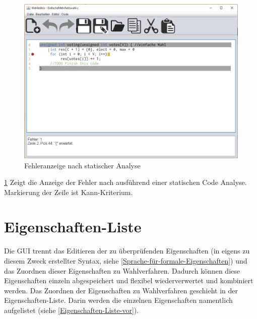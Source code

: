 \documentclass[a4paper]{scrreprt}
\begin{document}
\begin{figure}[H]
\includegraphics[scale=0.4]{Editor-mit-Fehler-nach-statischer-analyse.png}
\caption{Fehleranzeige nach statischer Analyse}
\label{Editor-mit-Fehler-nach-statischer-analyse}
\end{figure}

\ref{Editor-mit-Fehler-nach-statischer-analyse} Zeigt die Anzeige der Fehler nach ausführend einer statischen Code Analyse. Markierung der Zeile ist Kann-Kriterium.

\section{Eigenschaften-Liste}
Die GUI trennt das Editieren der zu überprüfenden Eigenschaften (in eigens zu diesem Zweck erstellter Syntax, siehe \ref{Sprache-für-formale-Eigenschaften}) und das Zuordnen dieser Eigenschaften zu Wahlverfahren. Dadurch können diese Eigenschaften einzeln abgespeichert und flexibel wiederverwertet und kombiniert werden. Das Zuordnen der Eigenschaften zu Wahlverfahren geschieht in der Eigenschaften-Liste. Darin werden die einzelnen Eigenschaften namentlich aufgelistet (siehe \ref{Eigenschaften-Liste-vor}). 
\end{document}
